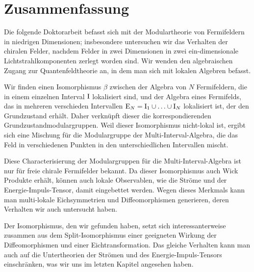 \vfill

\chapter*{Zusammenfassung}
Die folgende Doktorarbeit befasst sich 
mit der Modulartheorie von Fermifeldern in niedrigen Dimensionen;
insbesondere untersuchen wir das Verhalten der chiralen Felder,
nachdem Felder in zwei Dimensionen 
in zwei ein-dimensionale Lichtstrahlkomponenten 
zerlegt worden sind. Wir wenden den algebraischen
Zugang zur Quantenfeldtheorie an, in dem man sich mit 
lokalen Algebren befasst. 

Wir finden einen Isomorphismus $\beta$ zwischen 
der Algebra von $N$ Fermifeldern, die in einem einzelnen Interval
$\textrm{I}$ lokalisiert sind, und der Algebra eines Fermifelds, 
das in mehreren verschieden Intervallen $\textrm{E}_N
=\textrm{I}_1\cup\ldots\cup \textrm{I}_N$ lokalisiert ist, der den Grundzustand
erh\"alt. Daher verkn\"upft dieser die 
korrespondierenden Grundzustandmodulargruppen. Weil 
dieser Isomorphismus nicht-lokal ist, ergibt sich eine Mischung 
f\"ur die Modulargruppe der Multi-Interval-Algebra, 
die das Feld in verschiedenen Punkten in den unterschiedlichen 
Intervallen mischt.

\bigskip
Diese Characterisierung der Modulargruppen f\"ur die 
Multi-Interval-Algebra ist nur f\"ur freie chirale Fermifelder bekannt. 
Da dieser Isomorphismus auch Wick Produkte erh\"alt, k\"onnen auch
lokale Observablen, wie die Str\"ome und der Energie-Impuls-Tensor, 
damit eingebettet werden. Wegen dieses Merkmals kann man 
multi-lokale Eichsymmetrien und Diffeomorphismen generieren,
deren Verhalten wir auch untersucht haben.

\bigskip 
Der Isomorphismus, den wir gefunden haben, setzt sich interessanterweise
zusammen aus dem Split-Isomorphismus einer geeigneten Wirkung
der Diffeomorphismen und einer Eichtransformation. 
Das gleiche Verhalten kann man auch auf die 
Untertheorien der Str\"omen und des Energie-Impuls-Tensors 
einschr\"anken, was wir uns im letzten Kapitel angesehen haben.


\endgroup			

\vfill